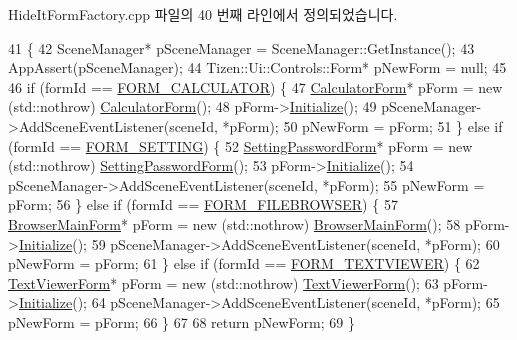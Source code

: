 Hide\+It\+Form\+Factory.\+cpp 파일의 40 번째 라인에서 정의되었습니다.


\begin{DoxyCode}
41                                              \{
42     SceneManager* pSceneManager = SceneManager::GetInstance();
43     AppAssert(pSceneManager);
44     Tizen::Ui::Controls::Form* pNewForm = null;
45 
46     \textcolor{keywordflow}{if} (formId == \hyperlink{_hide_it_form_factory_8cpp_a425a611240e669d4b6bccb6c70fd1e1b}{FORM\_CALCULATOR}) \{
47         \hyperlink{class_calculator_form}{CalculatorForm}* pForm = \textcolor{keyword}{new} (std::nothrow) \hyperlink{class_calculator_form}{CalculatorForm}();
48         pForm->\hyperlink{class_calculator_form_a51137823626f92e48605c6d9aa2e220f}{Initialize}();
49         pSceneManager->AddSceneEventListener(sceneId, *pForm);
50         pNewForm = pForm;
51     \} \textcolor{keywordflow}{else} \textcolor{keywordflow}{if} (formId == \hyperlink{_hide_it_form_factory_8cpp_a52c03680a60f4c67df2e836a73c1dfa7}{FORM\_SETTING}) \{
52         \hyperlink{class_setting_password_form}{SettingPasswordForm}* pForm = \textcolor{keyword}{new} (std::nothrow) 
      \hyperlink{class_setting_password_form}{SettingPasswordForm}();
53         pForm->\hyperlink{class_setting_password_form_ace791336d606d28535b440aeafc18fff}{Initialize}();
54         pSceneManager->AddSceneEventListener(sceneId, *pForm);
55         pNewForm = pForm;
56     \} \textcolor{keywordflow}{else} \textcolor{keywordflow}{if} (formId == \hyperlink{_hide_it_form_factory_8cpp_a6c375be4c97a7149bf3d7ad641ff0022}{FORM\_FILEBROWSER}) \{
57         \hyperlink{class_browser_main_form}{BrowserMainForm}* pForm = \textcolor{keyword}{new} (std::nothrow) 
      \hyperlink{class_browser_main_form}{BrowserMainForm}();
58         pForm->\hyperlink{class_browser_main_form_a738a1181319a716227fd2ae0feb26c98}{Initialize}();
59         pSceneManager->AddSceneEventListener(sceneId, *pForm);
60         pNewForm = pForm;
61     \} \textcolor{keywordflow}{else} \textcolor{keywordflow}{if} (formId == \hyperlink{_hide_it_form_factory_8cpp_a0684aff53dd7aa5443c992372709015b}{FORM\_TEXTVIEWER}) \{
62         \hyperlink{class_text_viewer_form}{TextViewerForm}* pForm = \textcolor{keyword}{new} (std::nothrow) \hyperlink{class_text_viewer_form}{TextViewerForm}();
63         pForm->\hyperlink{class_text_viewer_form_a4ad26f2e53b8f74ce5d3faefc551b2e6}{Initialize}();
64         pSceneManager->AddSceneEventListener(sceneId, *pForm);
65         pNewForm = pForm;
66     \}
67 
68     \textcolor{keywordflow}{return} pNewForm;
69 \}
\end{DoxyCode}


